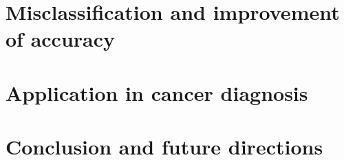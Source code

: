 \section{Misclassification and improvement of accuracy}
\section{Application in cancer diagnosis}
\section{Conclusion and future directions}